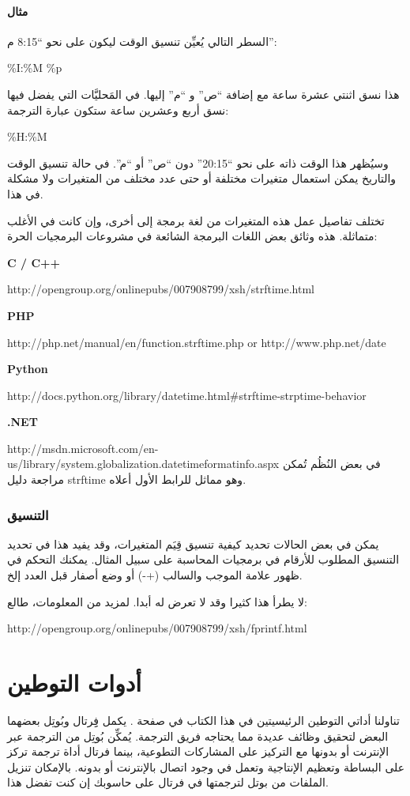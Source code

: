 \subsubsection{مثال}
السطر التالي يُعيِّن تنسيق الوقت ليكون على نحو “8:15 م”:

\%I:\%M \%p

هذا نسق اثنتي عشرة ساعة مع إضافة “ص” و “م” إليها. في المَحليَّات التي
يفضل فيها نسق أربع وعشرين ساعة ستكون عبارة الترجمة:

\%H:\%M

وسيُظهر هذا الوقت ذاته على نحو “20:15” دون “ص” أو “م”. في حالة تنسيق
الوقت والتاريخ يمكن استعمال متغيرات مختلفة أو حتى عدد مختلف من
المتغيرات ولا مشكلة في هذا.

تختلف تفاصيل عمل هذه المتغيرات من لغة برمجة إلى أخرى، وإن كانت في الأغلب
متماثلة. هذه وثائق بعض اللغات البرمجة الشائعة في مشروعات البرمجيات
الحرة:

\startitemize[1]
\item {\bf
C / C++}

http://opengroup.org/onlinepubs/007908799/xsh/strftime.html
\item {\bf
PHP}

http://php.net/manual/en/function.strftime.php  or 
http://www.php.net/date
\item {\bf
Python}

http://docs.python.org/library/datetime.html\#strftime-strptime-behavior
\item {\bf
.NET}

http://msdn.microsoft.com/en-us/library/system.globalization.datetimeformatinfo.aspx
\stopitemize
في بعض النُظُم تُمكن مراجعة دليل strftime وهو مماثل للرابط الأول أعلاه.

\subsection{التنسيق}
يمكن في بعض الحالات تحديد كيفية تنسيق قِيَم المتغيرات، وقد يفيد هذا في
تحديد التنسيق المطلوب للأرقام في برمجيات المحاسبة على سبيل المثال.
يمكنك التحكم في ظهور علامة الموجب والسالب (+ -) أو وضع
أصفار قبل العدد إلخ.

لا يطرأ هذا كثيرا وقد لا تعرض له أبدا. لمزيد من المعلومات، طالع:

http://opengroup.org/onlinepubs/007908799/xsh/fprintf.html

\chapter[ref:30364807]{أدوات التوطين}
تناولنا أداتي التوطين الرئيسيتين
في هذا الكتاب في صفحة \at[ref:20165030]. يكمل فِِرتال وبُوتِل
بعضهما البعض لتحقيق وظائف عديدة مما يحتاجه فريق الترجمة. يُمكِّن بُوتِل
من الترجمة عبر الإنترنت أو بدونها مع التركيز على المشاركات التطوعية،
بينما فرتال أداة ترجمة تركز على البساطة وتعظيم الإنتاجية وتعمل في وجود
اتصال بالإنترنت أو بدونه. بالإمكان تنزيل الملفات من بوتل لترجمتها في
فرتال على حاسوبك إن كنت تفضل هذا.

